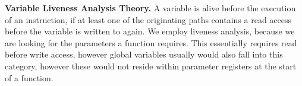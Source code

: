 \textbf{Variable Liveness Analysis Theory.}
\label{subsection:livenessanalysis}
A variable is alive before the execution of an instruction, if at least one of the originating paths contains a read access before the variable is written to again. We employ 
liveness analysis, because we are looking for the  parameters a function requires. This essentially requires read before write access, however global variables usually
would also fall into this category, however these would not reside within parameter registers at the start of a function.
%
%
%
